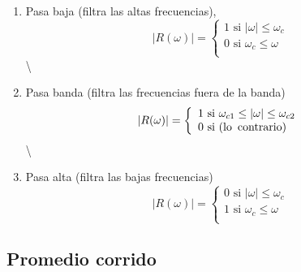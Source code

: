 \documentclass[
]{agujournal2019}
\providecommand{\tightlist}{%
  \setlength{\itemsep}{0pt}\setlength{\parskip}{0pt}}\usepackage{longtable,booktabs,array}
\begin{document}
\begin{enumerate}
\def\labelenumi{(\arabic{enumi})}
\tightlist
\item
  Pasa baja (filtra las altas frecuencias), \begin{equation*}
  |R(\omega)|=
    \left
    \lbrace
    \begin{array}{l}
   1 \text{ si } |\omega| \le \omega_c \\
   0 \text{ si } \omega_c \le \omega   \\
    \end{array}
    \right.
    \end{equation*} \textbackslash{}
\item
  Pasa banda (filtra las frecuencias fuera de la banda)
  \begin{equation*}
  |R(\omega)|=\left\lbrace
    \begin{array}{l}
   1 \text{ si } \omega_{c1}\le|\omega|\le \omega_{c2} \\
   0 \text{ si } \text({\rm lo}\,\,\,{\rm contrario}) \\
    \end{array}
    \right.
    \end{equation*} \textbackslash{}
\item
  Pasa alta (filtra las bajas frecuencias) \begin{equation*}
  |R(\omega)|=\left\lbrace
    \begin{array}{l}
   0 \text{ si } |\omega|\le \omega_c \\
   1 \text{ si } \omega_c\le\omega \\
    \end{array}
    \right.
    \end{equation*}
\end{enumerate}

\begin{center}
\end{center}

\hypertarget{promedio-corrido}{%
\subsection{Promedio corrido}\label{promedio-corrido}}
\end{document}
